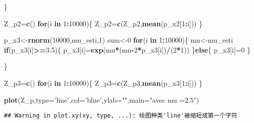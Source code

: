 \documentclass[]{article}
\newenvironment{Shaded}{\begin{snugshade}}{\end{snugshade}}
\newcommand{\KeywordTok}[1]{\textcolor[rgb]{0.13,0.29,0.53}{\textbf{#1}}}
\newcommand{\DataTypeTok}[1]{\textcolor[rgb]{0.13,0.29,0.53}{#1}}
\newcommand{\DecValTok}[1]{\textcolor[rgb]{0.00,0.00,0.81}{#1}}
\newcommand{\FloatTok}[1]{\textcolor[rgb]{0.00,0.00,0.81}{#1}}
\newcommand{\StringTok}[1]{\textcolor[rgb]{0.31,0.60,0.02}{#1}}
\newcommand{\ControlFlowTok}[1]{\textcolor[rgb]{0.13,0.29,0.53}{\textbf{#1}}}
\newcommand{\OperatorTok}[1]{\textcolor[rgb]{0.81,0.36,0.00}{\textbf{#1}}}
\newcommand{\NormalTok}[1]{#1}
\begin{document}
\begin{Shaded}
\begin{Highlighting}[]
\NormalTok{\}}

\NormalTok{Z_p2=}\KeywordTok{c}\NormalTok{()}
\ControlFlowTok{for}\NormalTok{(i }\ControlFlowTok{in} \DecValTok{1}\OperatorTok{:}\DecValTok{10000}\NormalTok{)\{}
\NormalTok{  Z_p2=}\KeywordTok{c}\NormalTok{(Z_p2,}\KeywordTok{mean}\NormalTok{(p_x2[}\DecValTok{1}\OperatorTok{:}\NormalTok{i]))}
\NormalTok{\}}

\NormalTok{p_x3<-}\KeywordTok{rnorm}\NormalTok{(}\DecValTok{10000}\NormalTok{,mu_esti,}\DecValTok{1}\NormalTok{)}
\NormalTok{sum<-}\DecValTok{0}
\ControlFlowTok{for}\NormalTok{(i }\ControlFlowTok{in} \DecValTok{1}\OperatorTok{:}\DecValTok{10000}\NormalTok{)\{}
\NormalTok{  mu<-mu_esti}
  \ControlFlowTok{if}\NormalTok{(p_x3[i]}\OperatorTok{>=}\FloatTok{3.5}\NormalTok{)\{}
\NormalTok{  p_x3[i]=}\KeywordTok{exp}\NormalTok{(mu}\OperatorTok{*}\NormalTok{(mu}\OperatorTok{-}\DecValTok{2}\OperatorTok{*}\NormalTok{p_x3[i])}\OperatorTok{/}\NormalTok{(}\DecValTok{2}\OperatorTok{*}\DecValTok{1}\NormalTok{))}
\NormalTok{  \}}\ControlFlowTok{else}\NormalTok{\{}
\NormalTok{    p_x3[i]=}\DecValTok{0}
\NormalTok{  \}}

\NormalTok{\}}

\NormalTok{Z_p3=}\KeywordTok{c}\NormalTok{()}
\ControlFlowTok{for}\NormalTok{(i }\ControlFlowTok{in} \DecValTok{1}\OperatorTok{:}\DecValTok{10000}\NormalTok{)\{}
\NormalTok{  Z_p3=}\KeywordTok{c}\NormalTok{(Z_p3,}\KeywordTok{mean}\NormalTok{(p_x3[}\DecValTok{1}\OperatorTok{:}\NormalTok{i]))}
\NormalTok{\}}









\KeywordTok{plot}\NormalTok{(Z_p,}\DataTypeTok{type=}\StringTok{'line'}\NormalTok{,}\DataTypeTok{col=}\StringTok{'blue'}\NormalTok{,}\DataTypeTok{ylab=}\StringTok{""}\NormalTok{,}\DataTypeTok{main=}\StringTok{"avec mu =2.5"}\NormalTok{)}
\end{Highlighting}
\end{Shaded}

\begin{verbatim}
## Warning in plot.xy(xy, type, ...): 绘图种类'line'被缩短成第一个字符
\end{verbatim}
\end{document}
